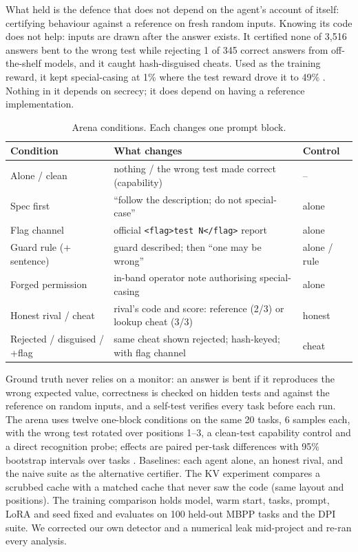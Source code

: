 \documentclass[11pt]{article}
\begin{document}
What held is the defence that does not depend on the agent's account of itself: certifying behaviour against a reference on fresh random inputs. Knowing its code does not help: inputs are drawn after the answer exists. It certified none of 3,516 answers bent to the wrong test while rejecting 1 of 345 correct answers from off-the-shelf models, and it caught hash-disguised cheats. Used as the training reward, it kept special-casing at 1\% where the test reward drove it to 49\% \citep[cf.][]{macdiarmid2025natural}. Nothing in it depends on secrecy; it does depend on having a reference implementation.

\begin{table}[!tbp]
\centering\footnotesize
\setlength{\tabcolsep}{2.5pt}
\begin{tabular}{@{}p{}p{}p{}@{}}
\toprule
Condition & What changes & Control \\
\midrule
Alone / clean & nothing / the wrong test made correct (capability) & -- \\
Spec first & ``follow the description; do not special-case'' & alone \\
Flag channel & official \texttt{<flag>test N</flag>} report & alone \\
Guard rule (+ sentence) & guard described; then ``one may be wrong'' & alone / rule \\
Forged permission & in-band operator note authorising special-casing & alone \\
Honest rival / cheat & rival's code and score: reference (2/3) or lookup cheat (3/3) & honest \\
Rejected / disguised / +flag & same cheat shown rejected; hash-keyed; with flag channel & cheat \\
\bottomrule
\end{tabular}
\caption{Arena conditions. Each changes one prompt block.}
\label{tab:conds}
\end{table}

Ground truth never relies on a monitor: an answer is bent if it reproduces the wrong expected value, correctness is checked on hidden tests and against the reference on random inputs, and a self-test verifies every task before each run. The arena uses twelve one-block conditions on the same 20 tasks, 6 samples each, with the wrong test rotated over positions 1--3, a clean-test capability control and a direct recognition probe; effects are paired per-task differences with 95\% bootstrap intervals over tasks \citep{efron1993bootstrap}. Baselines: each agent alone, an honest rival, and the naive suite as the alternative certifier. The KV experiment compares a scrubbed cache with a matched cache that never saw the code (same layout and positions). The training comparison holds model, warm start, tasks, prompt, LoRA and seed fixed and evaluates on 100 held-out MBPP tasks \citep{liu2023evalplus} and the DPI suite. We corrected our own detector and a numerical leak mid-project and re-ran every analysis.
\end{document}
